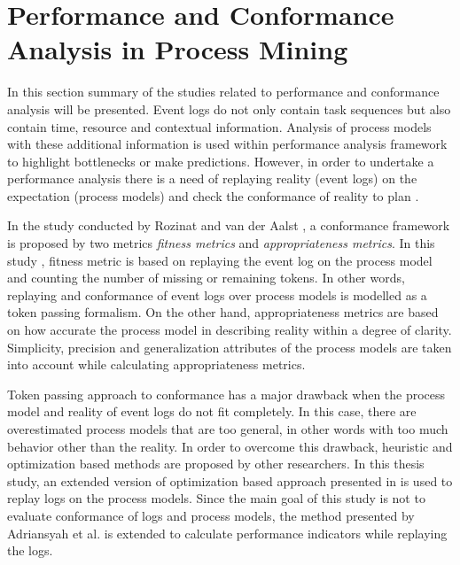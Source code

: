 \section{Performance and Conformance Analysis in Process Mining}
\label{sec:performance-and-conformance-analysis-in-process-mining}
In this section summary of the studies related to performance and conformance analysis will be presented. Event logs do not only contain task sequences but also contain time, resource and contextual information. Analysis of process models with these additional information is used within performance analysis framework to highlight bottlenecks or make predictions. However, in order to undertake a performance analysis there is a need of replaying reality (event logs) on the expectation (process models) and check the conformance of reality to plan \cite{van2012replaying}. 

In the study conducted by Rozinat and van der Aalst \cite{rozinat2008conformance}, a conformance framework is proposed by two metrics \textit{fitness metrics} and \textit{appropriateness metrics}. In this study \cite{rozinat2008conformance}, fitness metric is based on replaying the event log on the process model and counting the number of missing or remaining tokens. In other words, replaying and conformance of event logs over process models is modelled as a token passing formalism. On the other hand, appropriateness metrics are based on how accurate the process model in describing reality within a degree of clarity. Simplicity, precision and generalization attributes of the process models are taken into account while calculating appropriateness metrics.

Token passing approach to conformance has a major drawback when the process model and reality of event logs do not fit completely. In this case, there are overestimated process models that are too general, in other words with too much behavior other than the reality. In order to overcome this drawback, heuristic and optimization based methods are proposed by other researchers. In this thesis study, an extended version of optimization based approach presented in \cite{adriansyah2011conformance} is used to replay logs on the process models. Since the main goal of this study is not to evaluate conformance of logs and process models, the method presented by Adriansyah et al. is extended to calculate performance indicators while replaying the logs.